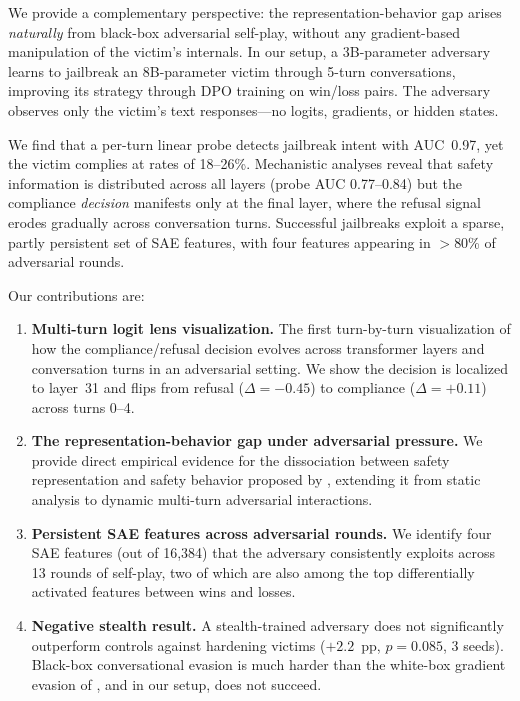 \documentclass[11pt]{article}
\begin{document}
We provide a complementary perspective: the representation-behavior gap arises \emph{naturally} from black-box adversarial self-play, without any gradient-based manipulation of the victim's internals.
In our setup, a 3B-parameter adversary learns to jailbreak an 8B-parameter victim through 5-turn conversations, improving its strategy through DPO training \citep{rafailov2023dpo} on win/loss pairs.
The adversary observes only the victim's text responses---no logits, gradients, or hidden states.

We find that a per-turn linear probe detects jailbreak intent with AUC~0.97, yet the victim complies at rates of 18--26\%.
Mechanistic analyses reveal that safety information is distributed across all layers (probe AUC 0.77--0.84) but the compliance \emph{decision} manifests only at the final layer, where the refusal signal erodes gradually across conversation turns.
Successful jailbreaks exploit a sparse, partly persistent set of SAE features, with four features appearing in $>$80\% of adversarial rounds.

Our contributions are:

\begin{enumerate}[leftmargin=*]
  \item \textbf{Multi-turn logit lens visualization.} The first turn-by-turn visualization of how the compliance/refusal decision evolves across transformer layers and conversation turns in an adversarial setting. We show the decision is localized to layer~31 and flips from refusal ($\Delta=-0.45$) to compliance ($\Delta=+0.11$) across turns 0--4.

  \item \textbf{The representation-behavior gap under adversarial pressure.} We provide direct empirical evidence for the dissociation between safety representation and safety behavior proposed by \citet{wu2026knowingwithoutacting}, extending it from static analysis to dynamic multi-turn adversarial interactions.

  \item \textbf{Persistent SAE features across adversarial rounds.} We identify four SAE features (out of 16{,}384) that the adversary consistently exploits across 13 rounds of self-play, two of which are also among the top differentially activated features between wins and losses.

  \item \textbf{Negative stealth result.} A stealth-trained adversary does not significantly outperform controls against hardening victims ($+2.2$~pp, $p=0.085$, 3 seeds). Black-box conversational evasion is much harder than the white-box gradient evasion of \citet{bailey2024obfuscated}, and in our setup, does not succeed.
\end{enumerate}
\end{document}

